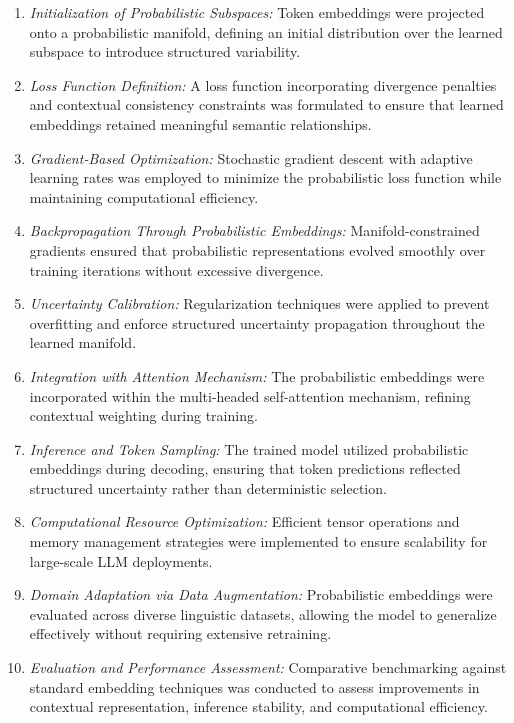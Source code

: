 \documentclass{article}
\begin{document}
\begin{enumerate}
	\item \textit{Initialization of Probabilistic Subspaces:} Token embeddings were projected onto a probabilistic manifold, defining an initial distribution over the learned subspace to introduce structured variability.
	\item \textit{Loss Function Definition:} A loss function incorporating divergence penalties and contextual consistency constraints was formulated to ensure that learned embeddings retained meaningful semantic relationships.
	\item \textit{Gradient-Based Optimization:} Stochastic gradient descent with adaptive learning rates was employed to minimize the probabilistic loss function while maintaining computational efficiency.
	\item \textit{Backpropagation Through Probabilistic Embeddings:} Manifold-constrained gradients ensured that probabilistic representations evolved smoothly over training iterations without excessive divergence.
	\item \textit{Uncertainty Calibration:} Regularization techniques were applied to prevent overfitting and enforce structured uncertainty propagation throughout the learned manifold.
	\item \textit{Integration with Attention Mechanism:} The probabilistic embeddings were incorporated within the multi-headed self-attention mechanism, refining contextual weighting during training.
	\item \textit{Inference and Token Sampling:} The trained model utilized probabilistic embeddings during decoding, ensuring that token predictions reflected structured uncertainty rather than deterministic selection.
	\item \textit{Computational Resource Optimization:} Efficient tensor operations and memory management strategies were implemented to ensure scalability for large-scale LLM deployments.
	\item \textit{Domain Adaptation via Data Augmentation:} Probabilistic embeddings were evaluated across diverse linguistic datasets, allowing the model to generalize effectively without requiring extensive retraining.
	\item \textit{Evaluation and Performance Assessment:} Comparative benchmarking against standard embedding techniques was conducted to assess improvements in contextual representation, inference stability, and computational efficiency.
\end{enumerate}
\end{document}
